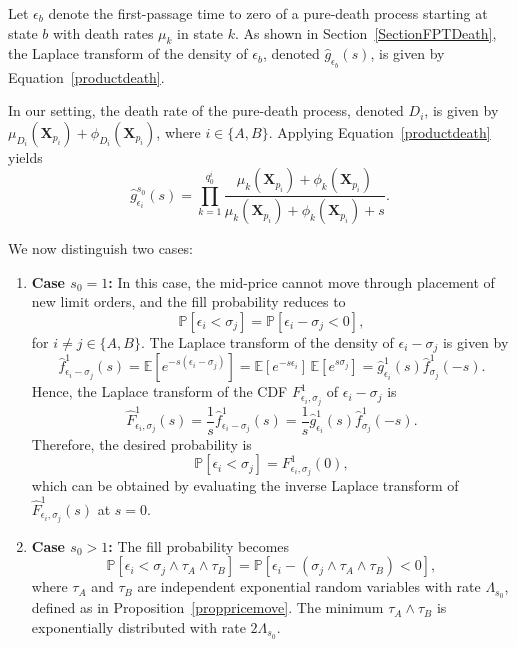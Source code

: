 \documentclass[11pt]{article}
\newenvironment{proof}{\noindent{\it Proof.}}{\hfill\fbox{}\vspace*{1mm}}
\begin{document}
\begin{proof}
Let $\epsilon_b$ denote the first-passage time to zero of a pure-death process starting at state $b$ with death rates $\mu_k$ in state $k$. As shown in Section~\ref{SectionFPTDeath}, the Laplace transform of the density of $\epsilon_b$, denoted $\hat{g}_{\epsilon_b}(s)$, is given by Equation~\eqref{productdeath}. 

In our setting, the death rate of the pure-death process, denoted $D_i$, is given by $\mu_{D_i}(\boldsymbol{X}_{p_i}) + \phi_{D_i}(\boldsymbol{X}_{p_i})$, where $i \in \{A, B\}$. Applying Equation~\eqref{productdeath} yields
\begin{equation}
    \hat{g}_{\epsilon_i}^{s_0}(s) = \prod_{k=1}^{q_0^i} \frac{\mu_k(\boldsymbol{X}_{p_i}) + \phi_k(\boldsymbol{X}_{p_i})}{\mu_k(\boldsymbol{X}_{p_i}) + \phi_k(\boldsymbol{X}_{p_i}) + s}.
\end{equation}

We now distinguish two cases:

\begin{enumerate}
    \item[\textbf{(i)}] \textbf{Case \( s_0 = 1 \):} In this case, the mid-price cannot move through placement of new limit orders, and the fill probability reduces to
    \[
        \mathbb{P}[\epsilon_i < \sigma_j] = \mathbb{P}[\epsilon_i - \sigma_j < 0],
    \]
    for \( i \neq j \in \{A, B\} \). The Laplace transform of the density of \( \epsilon_i - \sigma_j \) is given by
    \begin{equation}\label{fillprob_pdf}
        \hat{f}_{\epsilon_i - \sigma_j}^1(s) = \mathbb{E}\left[e^{-s(\epsilon_i - \sigma_j)}\right] = \mathbb{E}[e^{-s \epsilon_i}] \, \mathbb{E}[e^{s \sigma_j}] = \hat{g}_{\epsilon_i}^1(s) \hat{f}_{\sigma_j}^1(-s).
    \end{equation}
    Hence, the Laplace transform of the CDF \( F_{\epsilon_i, \sigma_j}^1 \) of \( \epsilon_i - \sigma_j \) is
    \[
        \hat{F}_{\epsilon_i, \sigma_j}^1(s) = \frac{1}{s} \hat{f}_{\epsilon_i - \sigma_j}^1(s) = \frac{1}{s} \hat{g}_{\epsilon_i}^1(s) \hat{f}_{\sigma_j}^1(-s).
    \]
    Therefore, the desired probability is
    \[
        \mathbb{P}[\epsilon_i < \sigma_j] = F_{\epsilon_i, \sigma_j}^1(0),
    \]
    which can be obtained by evaluating the inverse Laplace transform of \( \hat{F}_{\epsilon_i, \sigma_j}^1(s) \) at $s=0$.

    \item[\textbf{(ii)}] \textbf{Case \( s_0 > 1 \):} The fill probability becomes
    \[
        \mathbb{P}[\epsilon_i < \sigma_j \wedge \tau_A \wedge \tau_B] = \mathbb{P}[\epsilon_i - (\sigma_j \wedge \tau_A \wedge \tau_B) < 0],
    \]
    where \( \tau_A \) and \( \tau_B \) are independent exponential random variables with rate \( \Lambda_{s_0} \), defined as in Proposition~\ref{proppricemove}. The minimum \( \tau_A \wedge \tau_B \) is exponentially distributed with rate \( 2\Lambda_{s_0} \).


\end{enumerate}
\end{proof}
\end{document}
